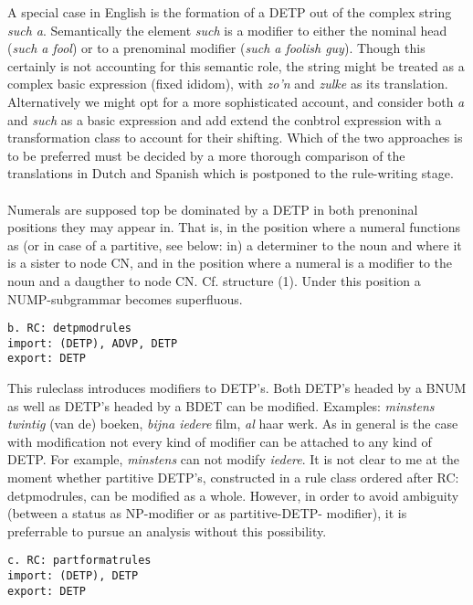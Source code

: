 A special case in English is the formation of a DETP out of the complex string
{\em such a}. Semantically the element {\em such} is a modifier to either the
nominal head ({\em such a fool}) or to a prenominal modifier ({\em  such a
foolish guy}). Though this certainly is not accounting for this semantic role,
the string might be treated as a complex basic expression (fixed ididom), 
with {\em zo'n}
and {\em zulke} as its translation. Alternatively we might opt for a more 
sophisticated account, and consider both {\em a} and {\em such} as a basic
expression and add extend the conbtrol expression with 
a transformation class to account for their shifting. Which of the two 
approaches is to be preferred must be decided by a more thorough comparison
of the translations in Dutch and Spanish which is postponed to the rule-writing 
stage. \\ \\ 

Numerals are supposed top be dominated by a DETP in both prenoninal positions
they may appear in. That is, in the position where a numeral functions as
(or in case of a partitive, see below: in) a determiner to the noun and where
it is a sister to node CN, and in the position where a numeral is a modifier to
the noun and a daugther to node CN. Cf. structure (1). Under this
position a NUMP-subgrammar becomes superfluous.

\begin{verbatim}
b. RC: detpmodrules 
import: (DETP), ADVP, DETP
export: DETP
\end{verbatim}

This ruleclass introduces modifiers to DETP's. Both DETP's headed by a BNUM as
well as DETP's headed by a BDET can be modified. Examples: {\em minstens
twintig} (van de) boeken, {\em bijna iedere} film, {\em al} haar werk. As in
general is the case with modification not every kind of modifier can be
attached to any kind of DETP. For example, {\em minstens} can not modify {\em
iedere}. It is not clear to me at the moment whether partitive DETP's,
constructed in a rule class ordered after RC: detpmodrules, can be modified as
a whole. However, in order to avoid ambiguity (between a status as NP-modifier
or as partitive-DETP- modifier), it is preferrable to pursue an analysis
without this possibility. 

\begin{verbatim}
c. RC: partformatrules 
import: (DETP), DETP
export: DETP
\end{verbatim}

